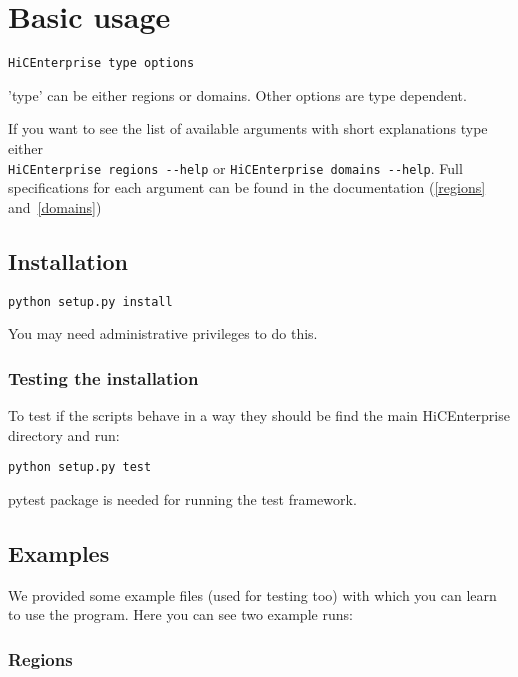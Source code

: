 \section{Basic usage}

\begin{lstlisting}
HiCEnterprise type options
\end{lstlisting}


'type' can be either regions or domains. Other options are type dependent.

If you want to see the list of available arguments with short explanations type either \\
\lstinline{HiCEnterprise regions --help}
or \lstinline{HiCEnterprise domains --help}. Full specifications for each argument can be found in the documentation
(\ref{regions} and~\ref{domains})

\subsection{Installation}

\begin{lstlisting}
python setup.py install
\end{lstlisting}


You may need administrative privileges to do this.

\subsubsection{Testing the installation}

To test if the scripts behave in a way they should be find the main HiCEnterprise directory and run:

\begin{lstlisting}
python setup.py test
\end{lstlisting}

pytest package is needed for running the test framework.


\subsection{Examples}

We provided some example files (used for testing too) with which you can learn to use the program.
Here you can see two example runs:

\subsubsection{Regions}

